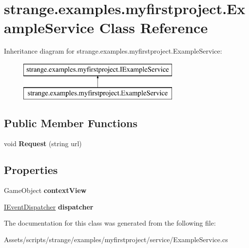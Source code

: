 \hypertarget{classstrange_1_1examples_1_1myfirstproject_1_1_example_service}{\section{strange.\-examples.\-myfirstproject.\-Example\-Service Class Reference}
\label{classstrange_1_1examples_1_1myfirstproject_1_1_example_service}
}
Inheritance diagram for strange.\-examples.\-myfirstproject.\-Example\-Service\-:\begin{figure}[H]
\begin{center}
\leavevmode
\includegraphics[height=2.000000cm]{classstrange_1_1examples_1_1myfirstproject_1_1_example_service}
\end{center}
\end{figure}
\subsection*{Public Member Functions}
\begin{DoxyCompactItemize}
\item 
\hypertarget{classstrange_1_1examples_1_1myfirstproject_1_1_example_service_afeee9526e8ae1cca0a9e9099d77f3edc}{void {\bfseries Request} (string url)}\label{classstrange_1_1examples_1_1myfirstproject_1_1_example_service_afeee9526e8ae1cca0a9e9099d77f3edc}

\end{DoxyCompactItemize}
\subsection*{Properties}
\begin{DoxyCompactItemize}
\item 
\hypertarget{classstrange_1_1examples_1_1myfirstproject_1_1_example_service_ae69618c1606904c42ec6437ff318794a}{Game\-Object {\bfseries context\-View}}\label{classstrange_1_1examples_1_1myfirstproject_1_1_example_service_ae69618c1606904c42ec6437ff318794a}

\item 
\hypertarget{classstrange_1_1examples_1_1myfirstproject_1_1_example_service_a6a46fa31e2f5b4f04b58efe7dabde7f5}{\hyperlink{interfacestrange_1_1extensions_1_1dispatcher_1_1eventdispatcher_1_1api_1_1_i_event_dispatcher}{I\-Event\-Dispatcher} {\bfseries dispatcher}}\label{classstrange_1_1examples_1_1myfirstproject_1_1_example_service_a6a46fa31e2f5b4f04b58efe7dabde7f5}

\end{DoxyCompactItemize}


The documentation for this class was generated from the following file\-:\begin{DoxyCompactItemize}
\item 
Assets/scripts/strange/examples/myfirstproject/service/Example\-Service.\-cs\end{DoxyCompactItemize}
